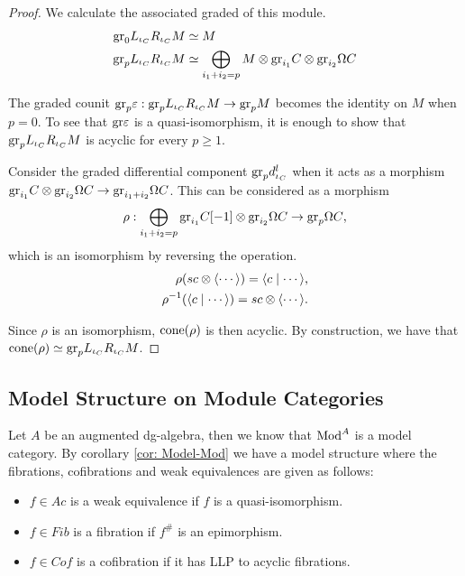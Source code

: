 \documentclass[../thesis.tex]{subfiles}
\begin{document}
\begin{proof}
                We calculate the associated graded of this module.
                \begin{align*}
                    \tt{gr}_0L_{\iota_C}R_{\iota_C}M & \simeq M \\
                    \tt{gr}_pL_{\iota_C}R_{\iota_C}M & \simeq \bigoplus_{i_1 + i_2 = p} M \otimes \tt{gr}_{i_1}C \otimes \tt{gr}_{i_2}\Omega C
                \end{align*}

                The graded counit $\tt{gr}_p\varepsilon : \tt{gr}_pL_{\iota_C}R_{\iota_C}M \rightarrow \tt{gr}_pM$ becomes the identity on $M$ when $p = 0$. To see that $\tt{gr}\varepsilon$ is a quasi-isomorphism, it is enough to show that $\tt{gr}_pL_{\iota_C}R_{\iota_C}M$ is acyclic for every $p \geq 1$.

                Consider the graded differential component $\tt{gr}_pd^l_{\iota_C}$ when it acts as a morphism $\tt{gr}_{i_1}C \otimes \tt{gr}_{i_2}\Omega C \rightarrow \tt{gr}_{i_1+i_2}\Omega C$. This can be considered as a morphism 
                \begin{align*}
                    \rho : \bigoplus_{i_1 + i_2 = p} \tt{gr}_{i_1}C[-1] \otimes \tt{gr}_{i_2}\Omega C \rightarrow \tt{gr}_{p}\Omega C\tt{,}
                \end{align*}
                which is an isomorphism by reversing the operation.
                \begin{align*}
                    \rho (sc \otimes \langle \cdots \rangle) = \langle c \mid \cdots \rangle\tt{,} \\
                    \rho^{-1}(\langle c \mid \cdots \rangle) = sc \otimes \langle \cdots \rangle\tt{.}
                \end{align*}

                Since $\rho$ is an isomorphism, $\tt{cone}(\rho)$ is then acyclic. By construction, we have that \\ $\tt{cone}(\rho) \simeq \tt{gr}_pL_{\iota_C}R_{\iota_C}M$.

            \end{proof}

        \subsection{Model Structure on Module Categories}

            Let $A$ be an augmented dg-algebra, then we know that $\tt{Mod}^A$ is a model category. By corollary \ref{cor: Model-Mod} we have a model structure where the fibrations, cofibrations and weak equivalences are given as follows:
            \begin{itemize}
                \item $f\in Ac$ is a weak equivalence if $f$ is a quasi-isomorphism.
                \item $f\in Fib$ is a fibration if $f^\#$ is an epimorphism.
                \item $f\in Cof$ is a cofibration if it has LLP to acyclic fibrations. 
            \end{itemize}
\end{document}
